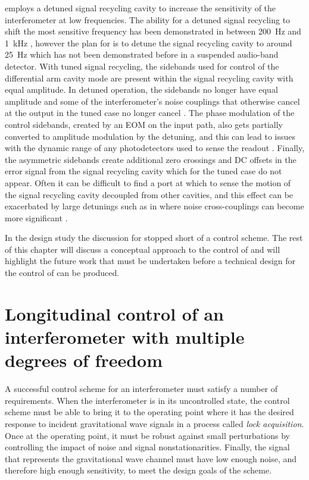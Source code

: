 \ETLF{} employs a detuned signal recycling cavity to increase the sensitivity of the interferometer at low frequencies. The ability for a detuned signal recycling to shift the most sensitive frequency has been demonstrated in \GEO{} between \SI{200}{\hertz} and \SI{1}{\kilo\hertz} \cite{Hild2006}, however the plan for \ETLF{} is to detune the signal recycling cavity to around \SI{25}{\hertz} which has not been demonstrated before in a suspended audio-band detector. With tuned signal recycling, the sidebands used for control of the differential arm cavity mode are present within the signal recycling cavity with equal amplitude. In detuned operation, the sidebands no longer have equal amplitude and some of the interferometer's noise couplings that otherwise cancel at the output in the tuned case no longer cancel \cite{Hild2007}. The phase modulation of the control sidebands, created by an \gls{EOM} on the input path, also gets partially converted to amplitude modulation by the detuning, and this can lead to issues with the dynamic range of any photodetectors used to sense the readout \cite{Grote2007}. Finally, the asymmetric sidebands create additional zero crossings and \gls{DC} offsets in the error signal from the signal recycling cavity which for the tuned case do not appear. Often it can be difficult to find a port at which to sense the motion of the signal recycling cavity decoupled from other cavities, and this effect can be exacerbated by large detunings such as in \ETLF{} where noise cross-couplings can become more significant \cite{Hild2007}.

In the \ET{} design study the discussion for \ETLF{} stopped short of a control scheme. The rest of this chapter will discuss a conceptual approach to the control of \ETLF{} and will highlight the future work that must be undertaken before a technical design for the control of \ETLF{} can be produced.

\section{Longitudinal control of an interferometer with multiple degrees of freedom}
A successful control scheme for an interferometer must satisfy a number of requirements. When the interferometer is in its uncontrolled state, the control scheme must be able to bring it to the operating point where it has the desired response to incident gravitational wave signals in a process called \emph{lock acquisition}. Once at the operating point, it must be robust against small perturbations by controlling the impact of noise and signal nonstationarities. Finally, the signal that represents the gravitational wave channel must have low enough noise, and therefore high enough sensitivity, to meet the design goals of the scheme.

